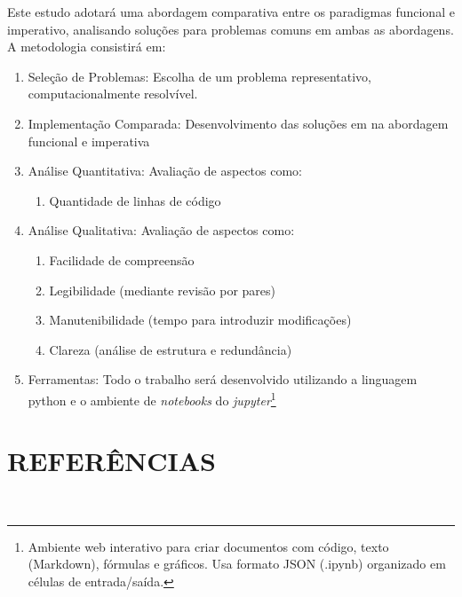 \documentclass[date,twocolumn,a4paper]{ppgem}
\begin{document}
    Este estudo adotará uma abordagem comparativa entre os paradigmas funcional e imperativo, analisando soluções para problemas comuns em ambas as abordagens. A metodologia consistirá em:
    \begin{enumerate}
        \item Seleção de Problemas: Escolha de um problema representativo, computacionalmente resolvível.
        \item Implementação Comparada: Desenvolvimento das soluções em na abordagem funcional e imperativa
        \item Análise Quantitativa: Avaliação de aspectos como:
        \begin{enumerate}
            \item Quantidade de linhas de código
        \end{enumerate}
        \item Análise Qualitativa: Avaliação de aspectos como:
        \begin{enumerate}
            \item Facilidade de compreensão
            \item Legibilidade (mediante revisão por pares)
            \item Manutenibilidade (tempo para introduzir modificações)
            \item Clareza (análise de estrutura e redundância)
        \end{enumerate}
        \item Ferramentas: Todo o trabalho será desenvolvido utilizando a linguagem python
            e o ambiente de \textit{notebooks} do \textit{jupyter}\footnote{
                 Ambiente web interativo para criar documentos com código, texto (Markdown), fórmulas e gráficos. Usa formato JSON (.ipynb) organizado em células de entrada/saída\cite{wiki_jupyter_notebook}.
            }
    \end{enumerate}


    
    
    
    
    \section{REFERÊNCIAS}\\
    
\end{document}

